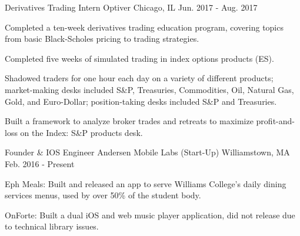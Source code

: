 

\begin{cventries}

  \cventry
    {Derivatives Trading Intern} %
    {Optiver} %
    {Chicago, IL} %
    {Jun. 2017 - Aug. 2017} %
    {
      \begin{cvitems} %
        \item {Completed a ten-week derivatives trading education program, covering topics from basic Black-Scholes pricing to trading strategies.}
        \item {Completed five weeks of simulated trading in index options products (ES).}
        \item {Shadowed traders for one hour each day on a variety of different products; market-making desks included S\&P, Treasuries, Commodities, Oil, Natural Gas, Gold, and Euro-Dollar; position-taking desks included S\&P and Treasuries.}
        \item {Built a framework to analyze broker trades and retreats to maximize profit-and-loss on the Index: S\&P products desk.}
      \end{cvitems}
    }

  \cventry
    {Founder \& IOS Engineer} %
    {Andersen Mobile Labs (Start-Up)} %
    {Williamstown, MA} %
    {Feb. 2016 - Present} %
    {
      \begin{cvitems} %
        \item {Eph Meals: Built and released an app to serve Williams College's daily dining services menus, used by over 50\% of the student body.}
        \item {OnForte: Built a dual iOS and web music player application, did not release due to technical library issues.}
      \end{cvitems}
    }


\end{cventries}
